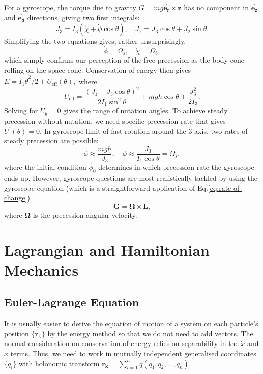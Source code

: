 \documentclass{article}
\begin{document}
For a gyroscope, the torque due to gravity $G = mg \hat{\mathbf{e_r}} \times \mathbf{z}$ has no component in $\hat{\mathbf{e_z}} $ and $\hat{\mathbf{e_3}} $ directions, giving two first integrals:
\[
    J_3 = I_3 (\dot{\chi } + \dot{\phi } \cos{\theta }), \quad 
    J_z = J_3 \cos{\theta } + J_2 \sin \theta. 
\]
Simplifying the two equations gives, rather unsurprisingly, 
\[
    \boxed{
    \dot{\phi } = \Omega_s, \quad 
    \dot{\chi } = \Omega_b, }
\]
which simply confirms our perception of the free precession as the body cone rolling on the space cone. Conservation of energy then gives $E = I_1 \dot{\theta }^{2} /2 + U_{\mathrm{eff}}(\theta),$ where 
\[
    U_{\mathrm{eff}} = \frac{(J_z - J_3 \cos \theta )^{2} }{2I_1 \sin^{2} \theta } + mgh \cos \theta + \frac{J_3 ^{2} }{2I_3}. 
\]
Solving for $U_{\theta } = 0$ gives the range of nutation angles. To achieve steady precession without nutation, we need specific precession rate that gives $U^\prime(\theta ) = 0$. In gyroscope limit of fast rotation around the 3-axis, two rates of steady precession are possible:
\[
    \dot{\phi} \approx \frac{mgh}{J_3}, \quad 
    \dot{\phi } \approx \frac{J_3}{I_1 \cos \theta } = \Omega_s, 
\]
where the initial condition $\dot{\phi_0}$ determines in which precession rate the gyroscope ends up. However, gyroscope questions are most realistically tackled by using the gyroscope equation (which is a straightforward application of Eq.\eqref{eq:rate-of-change})
\[
    \boxed{\mathbf{G} = \boldsymbol{\mathbf{\Omega}} \times \mathbf{L},}
\]
where $\mathbf{\Omega}$ is the precession angular velocity. 

\section{Lagrangian and Hamiltonian Mechanics}
\subsection{Euler-Lagrange Equation}
It is usually easier to derive the equation of motion of a system on each particle's position $\{\mathbf{r_k}\}$ by the energy method so that we do not need to add vectors. The normal consideration on conservation of energy relies on separability in the $\dot{x}$ and $\ddot{x} $ terms. Thus, we need to work in mutually independent generalised coordinates $\{q_i\}$ with holonomic transform $\mathbf{r_k} = \sum_{i=1}^{n} q(q_1, q_2, \ldots, q_n ).$
\end{document}
